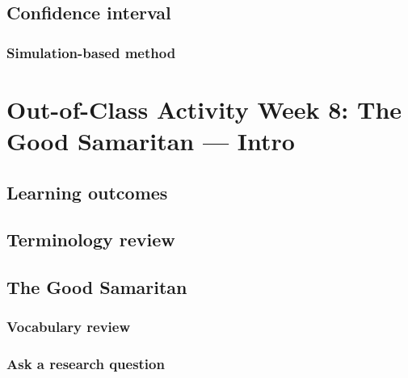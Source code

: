 \documentclass[
]{report}
\begin{document}
\hypertarget{confidence-interval-2}{%
\subsection*{Confidence interval}\label{confidence-interval-2}}

\hypertarget{simulation-based-method-3}{%
\subsubsection*{Simulation-based method}\label{simulation-based-method-3}}

\hypertarget{out-of-class-activity-week-8-the-good-samaritan-intro}{%
\section{Out-of-Class Activity Week 8: The Good Samaritan --- Intro}\label{out-of-class-activity-week-8-the-good-samaritan-intro}}

\hypertarget{learning-outcomes-14}{%
\subsection{Learning outcomes}\label{learning-outcomes-14}}

\hypertarget{terminology-review-13}{%
\subsection{Terminology review}\label{terminology-review-13}}

\hypertarget{the-good-samaritan}{%
\subsection{The Good Samaritan}\label{the-good-samaritan}}

\hypertarget{vocabulary-review-1}{%
\subsubsection*{Vocabulary review}\label{vocabulary-review-1}}

\hypertarget{ask-a-research-question-1}{%
\subsubsection*{Ask a research question}\label{ask-a-research-question-1}}
\end{document}
